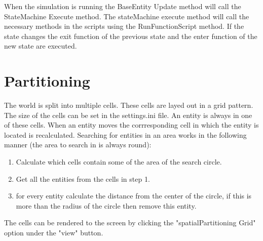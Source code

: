 \documentclass[10pt]{article}
\begin{document}
   When the simulation is running the BaseEntity Update method will call the StateMachine Execute method. The stateMachine execute method will call the necessary methods in the scripts using the RunFunctionScript method. If the state changes the exit function of the previous state and the enter function of the new state are executed.
   
   \newpage
   \section {Partitioning}
   The world is split into multiple cells. These cells are layed out in a grid pattern. The size of the cells can be set in the settings.ini file. An entity is always in one of these cells. When an entity moves the corrresponding cell in which the entity is located is recalculated. Searching for entities in an area works in the following manner (the area to search in is always round):
   \begin{enumerate}
   \item Calculate which cells contain some of the area of the search circle.
   \item Get all the entities from the cells in step 1.
   \item for every entity calculate the distance from the center of the circle, if this is more than the radius of the circle then remove this entity.
   \end{enumerate}
   The cells can be rendered to the screen by clicking the "spatialPartitioning Grid" option under the "view" button. 
\newpage
 
\end{document}
